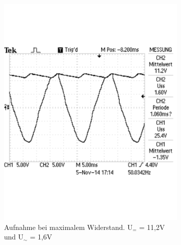 \documentclass[12pt,a4paper]{article}
\begin{document}
\begin{figure}[H]
        \centering
        \begin{subfigure}[b]{0.48\textwidth}
                \includegraphics[width=\textwidth , scale = 0.4]{2_5_100F_1.pdf}
                \caption[Aufnahme bei maximalem Widerstand. U$_{=}$ = 11,2V und U$_\sim$ = 1,6V]{Aufnahme bei maximalem Widerstand. U$_{=}$ = 11,2V und U$_\sim$ = 1,6V}
 				 \label{fig:2_5_100F_1}
        \end{subfigure}%
        \hfill
        \begin{subfigure}[b]{0.48\textwidth}

\end{subfigure}
\end{figure}
\end{document}
